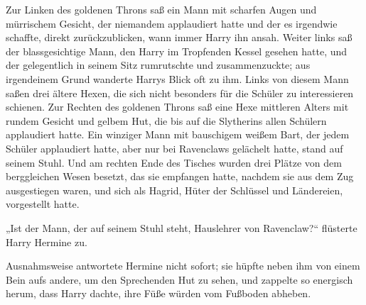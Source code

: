 Zur Linken des goldenen Throns saß ein Mann mit scharfen Augen und mürrischem Gesicht, der niemandem applaudiert hatte und der es irgendwie schaffte, direkt zurückzublicken, wann immer Harry ihn ansah. Weiter links saß der blassgesichtige Mann, den Harry im Tropfenden Kessel gesehen hatte, und der gelegentlich in seinem Sitz rumrutschte und zusammenzuckte; aus irgendeinem Grund wanderte Harrys Blick oft zu ihm. Links von diesem Mann saßen drei ältere Hexen, die sich nicht besonders für die Schüler zu interessieren schienen. Zur Rechten des goldenen Throns saß eine Hexe mittleren Alters mit rundem Gesicht und gelbem Hut, die bis auf die Slytherins allen Schülern applaudiert hatte. Ein winziger Mann mit bauschigem weißem Bart, der jedem Schüler applaudiert hatte, aber nur bei Ravenclaws gelächelt hatte, stand auf seinem Stuhl. Und am rechten Ende des Tisches wurden drei Plätze von dem berggleichen Wesen besetzt, das sie empfangen hatte, nachdem sie aus dem Zug ausgestiegen waren, und sich als Hagrid, Hüter der Schlüssel und Ländereien, vorgestellt hatte.

„Ist der Mann, der auf seinem Stuhl steht, Hauslehrer von Ravenclaw?“ flüsterte Harry Hermine zu.

Ausnahmsweise antwortete Hermine nicht sofort; sie hüpfte neben ihm von einem Bein aufs andere, um den Sprechenden Hut zu sehen, und zappelte so energisch herum, dass Harry dachte, ihre Füße würden vom Fußboden abheben.

